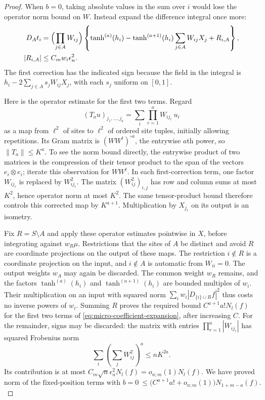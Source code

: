 \begin{proof}
When $b=0$, taking absolute values in the sum over $i$ would lose the
operator norm bound on $W$.  Instead expand the difference integral once
more:
\begin{align}
 D_A t_i={}&\Bigl(\prod_{j\in A}W_{ij}\Bigr)
 \left\{\tanh^{(a)}(h_i)
 -\tanh^{(a+1)}(h_i)\sum_{j\in A}W_{ij}X_j+R_{i,A}\right\},
 \label{eq:micro-coefficient-expansion}\\
 |R_{i,A}|\le{}&C_m w_i\epsilon_n^2.\nonumber
\end{align}
The first correction has the indicated sign because the field in the
integral is $h_i-2\sum_{j\in A}s_jW_{ij}X_j$, with each $s_j$ uniform on
$[0,1]$.

Here is the operator estimate for the first two terms.  Regard
\[
 (T_a u)_{j_1,\ldots,j_a}
       =\sum_i\prod_{r=1}^a W_{ij_r}\,u_i
\]
as a map from $\ell^2$ of sites to $\ell^2$ of ordered site tuples,
initially allowing repetitions.  Its Gram matrix is
$(WW^t)^{\circ a}$, the entrywise $a$th power, so $\|T_a\|\le K^a$.
To see the norm bound directly, the entrywise product of two matrices is
the compression of their tensor product to the span of the vectors
$e_i\otimes e_i$; iterate this observation for $WW^t$.
In each first-correction term, one factor $W_{ij_r}$ is replaced by
$W_{ij_r}^2$.  The matrix $(W_{ij}^2)_{i,j}$ has row and column sums at most
$K^2$, hence operator norm at most $K^2$.  The same tensor-product bound
therefore controls this corrected map by $K^{a+1}$.  Multiplication by
$X_{j_r}$ on its output is an isometry.

Fix $R=S\setminus A$ and apply these operator estimates pointwise in $X$,
before integrating against $w_R\mu$.  Restrictions that the sites of $A$ be distinct
and avoid $R$ are coordinate projections on the output of these maps.
The restriction $i\notin R$ is a coordinate projection on the input, and
$i\notin A$ is automatic from $W_{ii}=0$.  The output weights $w_A$ may
again be discarded.  The common weight $w_R$ remains, and the factors
$\tanh^{(a)}(h_i)$ and $\tanh^{(a+1)}(h_i)$ are bounded multiples of $w_i$.
Their multiplication on an input with squared norm
$\sum_iw_i|D_{\{i\}\cup R}f|^2$ thus costs no inverse powers of $w_i$.
Summing $R$ proves the required bound $C^{a+1}a!N_l(f)$ for the first
two terms of \eqref{eq:micro-coefficient-expansion}, after increasing $C$.
For the remainder, signs may be discarded: the matrix with entries
$\prod_{r=1}^a|W_{ij_r}|$ has squared Frobenius norm
\[
 \sum_i\left(\sum_jW_{ij}^2\right)^a\le nK^{2a}.
\]
Its contribution is at most
$C_m\sqrt n\epsilon_n^2N_l(f)=o_{n;m}(1)N_l(f)$.  We have proved
\begin{equation}
 \text{norm of the fixed-position terms with }b=0
 \ \le\bigl(C^{a+1}a!+o_{n;m}(1)\bigr)N_{1+m-a}(f).
 \label{eq:micro-unshared-slot-bound}
\end{equation}


\end{proof}
